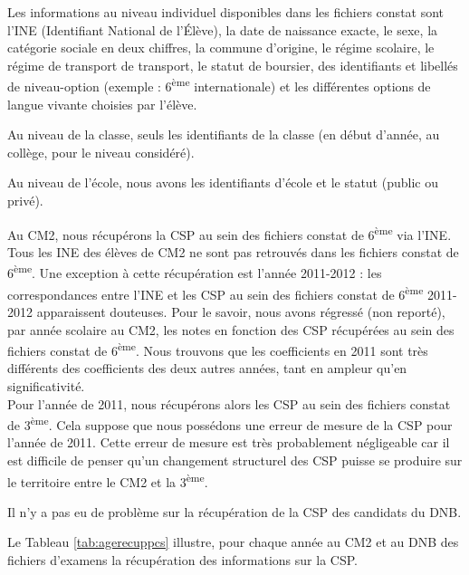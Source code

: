 \documentclass[
]{book}
\begin{document}
\quad Les informations au niveau individuel disponibles dans les fichiers constat sont l'INE (Identifiant National de l'Élève), la date de naissance exacte, le sexe, la catégorie sociale en deux chiffres, la commune d'origine, le régime scolaire, le régime de transport de transport, le statut de boursier, des identifiants et libellés de niveau-option (exemple : 6\textsuperscript{ème} internationale) et les différentes options de langue vivante choisies par l'élève.

\quad Au niveau de la classe, seuls les identifiants de la classe (en début d'année, au collège, pour le niveau considéré).

\quad Au niveau de l'école, nous avons les identifiants d'école et le statut (public ou privé).

\quad Au CM2, nous récupérons la CSP au sein des fichiers constat de 6\textsuperscript{ème} via l'INE. Tous les INE des élèves de CM2 ne sont pas retrouvés dans les fichiers constat de 6\textsuperscript{ème}. Une exception à cette récupération est l'année 2011-2012 : les correspondances entre l'INE et les CSP au sein des fichiers constat de 6\textsuperscript{ème} 2011-2012 apparaissent douteuses. Pour le savoir, nous avons régressé (non reporté), par année scolaire au CM2, les notes en fonction des CSP récupérées au sein des fichiers constat de 6\textsuperscript{ème}. Nous trouvons que les coefficients en 2011 sont très différents des coefficients des deux autres années, tant en ampleur qu'en significativité.\\
Pour l'année de 2011, nous récupérons alors les CSP au sein des fichiers constat de 3\textsuperscript{ème}. Cela suppose que nous possédons une erreur de mesure de la CSP pour l'année de 2011. Cette erreur de mesure est très probablement négligeable car il est difficile de penser qu'un changement structurel des CSP puisse se produire sur le territoire entre le CM2 et la 3\textsuperscript{ème}.

Il n'y a pas eu de problème sur la récupération de la CSP des candidats du DNB.

\quad Le Tableau \ref{tab:agerecuppcs} illustre, pour chaque année au CM2 et au DNB des fichiers d'examens la récupération des informations sur la CSP.

\begingroup\fontsize{8}{10}\selectfont
\end{document}
